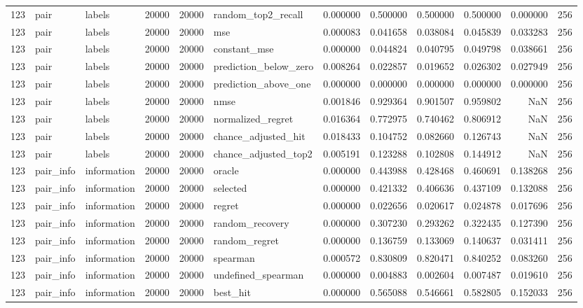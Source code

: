 \begin{tabular}{rllrrlrrrrrr}
123 & pair & labels & 20000 & 20000 & random_top2_recall & 0.000000 & 0.500000 & 0.500000 & 0.500000 & 0.000000 & 256 \\
123 & pair & labels & 20000 & 20000 & mse & 0.000083 & 0.041658 & 0.038084 & 0.045839 & 0.033283 & 256 \\
123 & pair & labels & 20000 & 20000 & constant_mse & 0.000000 & 0.044824 & 0.040795 & 0.049798 & 0.038661 & 256 \\
123 & pair & labels & 20000 & 20000 & prediction_below_zero & 0.008264 & 0.022857 & 0.019652 & 0.026302 & 0.027949 & 256 \\
123 & pair & labels & 20000 & 20000 & prediction_above_one & 0.000000 & 0.000000 & 0.000000 & 0.000000 & 0.000000 & 256 \\
123 & pair & labels & 20000 & 20000 & nmse & 0.001846 & 0.929364 & 0.901507 & 0.959802 & NaN & 256 \\
123 & pair & labels & 20000 & 20000 & normalized_regret & 0.016364 & 0.772975 & 0.740462 & 0.806912 & NaN & 256 \\
123 & pair & labels & 20000 & 20000 & chance_adjusted_hit & 0.018433 & 0.104752 & 0.082660 & 0.126743 & NaN & 256 \\
123 & pair & labels & 20000 & 20000 & chance_adjusted_top2 & 0.005191 & 0.123288 & 0.102808 & 0.144912 & NaN & 256 \\
123 & pair_info & information & 20000 & 20000 & oracle & 0.000000 & 0.443988 & 0.428468 & 0.460691 & 0.138268 & 256 \\
123 & pair_info & information & 20000 & 20000 & selected & 0.000000 & 0.421332 & 0.406636 & 0.437109 & 0.132088 & 256 \\
123 & pair_info & information & 20000 & 20000 & regret & 0.000000 & 0.022656 & 0.020617 & 0.024878 & 0.017696 & 256 \\
123 & pair_info & information & 20000 & 20000 & random_recovery & 0.000000 & 0.307230 & 0.293262 & 0.322435 & 0.127390 & 256 \\
123 & pair_info & information & 20000 & 20000 & random_regret & 0.000000 & 0.136759 & 0.133069 & 0.140637 & 0.031411 & 256 \\
123 & pair_info & information & 20000 & 20000 & spearman & 0.000572 & 0.830809 & 0.820471 & 0.840252 & 0.083260 & 256 \\
123 & pair_info & information & 20000 & 20000 & undefined_spearman & 0.000000 & 0.004883 & 0.002604 & 0.007487 & 0.019610 & 256 \\
123 & pair_info & information & 20000 & 20000 & best_hit & 0.000000 & 0.565088 & 0.546661 & 0.582805 & 0.152033 & 256 \\

\end{tabular}
